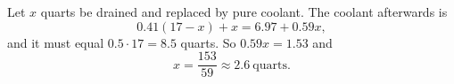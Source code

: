 Let $x$ quarts be drained and replaced by pure coolant. The coolant afterwards is
\[
0.41(17-x)+x=6.97+0.59x ,
\]
and it must equal $0.5\cdot17=8.5$ quarts. So $0.59x=1.53$ and
\[
x=\dfrac{153}{59}\approx\boxed{2.6}\ \text{quarts}.
\]
